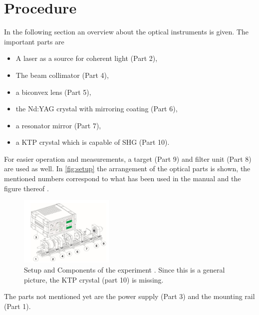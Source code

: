 \section{Procedure}
\label{sec:procedure}
In the following section an overview about the optical instruments is given. The important parts are
\begin{itemize}
  \item A laser as a source for coherent light (Part 2),
  \item The beam collimator (Part 4),
  \item a biconvex lens (Part 5),
  \item the Nd:YAG crystal with mirroring coating (Part 6),
  \item a resonator mirror (Part 7),
  \item a KTP crystal which is capable of SHG (Part 10).
\end{itemize}
For easier operation and measurements, a target (Part 9) and filter unit (Part 8) are used as well. 
In \autoref{fig:setup} the arrangement of the optical parts is shown, the mentioned numbers
correspond to what has been used in the manual and the figure thereof \cite{elas_manual}.
\begin{figure}
    \centering
    \includegraphics[width=0.4\textwidth]{media/Setup.png}
    \caption{Setup and Components of the experiment \cite{elas_manual}. Since this is a general
    picture, the KTP crystal (part 10) is missing.}
    \label{fig:setup}
\end{figure}
The parts not mentioned yet are the power supply (Part 3) and the mounting rail (Part 1).

